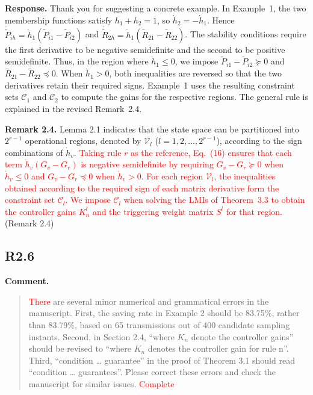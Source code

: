\documentclass[12pt,a4paper]{article}
\begin{document}
\textbf{Response.}
\begingroup
\setlength{\parskip}{6pt}
Thank you for suggesting a concrete example. In Example~1, the two membership functions satisfy $h_1+h_2=1$, so $\dot h_2=-\dot h_1$. Hence $\dot{\widetilde P}_{ih}=\dot h_1(\widetilde P_{i1}-\widetilde P_{i2})$ and $\dot{\widetilde R}_{2h}=\dot h_1(\widetilde R_{21}-\widetilde R_{22})$. The stability conditions require the first derivative to be negative semidefinite and the second to be positive semidefinite. Thus, in the region where $\dot h_1\leq 0$, we impose $\widetilde P_{i1}-\widetilde P_{i2}\succeq 0$ and $\widetilde R_{21}-\widetilde R_{22}\preceq 0$. When $\dot h_1>0$, both inequalities are reversed so that the two derivatives retain their required signs. Example~1 uses the resulting constraint sets $\mathcal C_1$ and $\mathcal C_2$ to compute the gains for the respective regions. The general rule is explained in the revised Remark~2.4.\par
\noindent \textbf{Remark 2.4.} Lemma 2.1 indicates that the state space can be partitioned into $2^{r-1}$ operational regions, denoted by $\mathcal{V}_l$ ($l = 1,2,\dots,2^{r-1}$), according to the sign combinations of $\dot{h}_v$. \textcolor{red}{Taking rule $r$ as the reference, Eq.~(16) ensures that each term $\dot h_v(G_v-G_r)$ is negative semidefinite by requiring $G_v-G_r\succeq 0$ when $\dot h_v\leq 0$ and $G_v-G_r\preceq 0$ when $\dot h_v>0$. For each region $\mathcal V_l$, the inequalities obtained according to the required sign of each matrix derivative form the constraint set $\mathcal C_l$. We impose $\mathcal C_l$ when solving the LMIs of Theorem~3.3 to obtain the controller gains $K_n^l$ and the triggering weight matrix $S^l$ for that region.} (Remark 2.4)\par
\endgroup

\subsection*{R2.6}

\textbf{Comment.}
\begin{quote}
\raggedright
\textcolor{red}{There} are several minor numerical and grammatical errors in the manuscript. First, the saving rate in Example 2 should be 83.75\%, rather than 83.79\%, based on 65 transmissions out of 400 candidate sampling instants. Second, in Section 2.4, ``where $K_n$ denote the controller gains'' should be revised to ``where $K_n$ denotes the controller gain for rule n''. Third, ``condition \ldots{} guarantee'' in the proof of Theorem 3.1 should read ``condition \ldots{} guarantees''. Please correct these errors and check the manuscript for similar issues. \textcolor{red}{Complete}
\end{quote}
\end{document}
